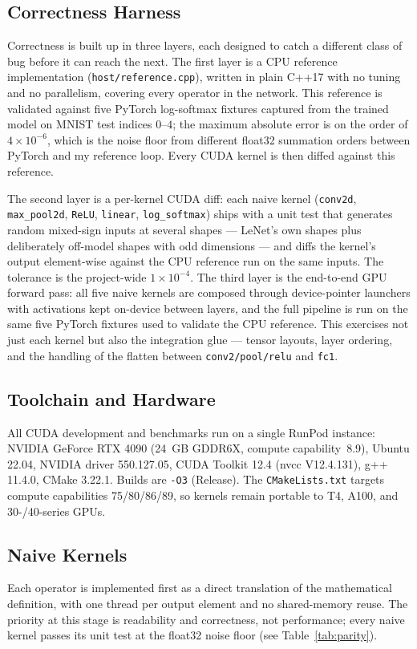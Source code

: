 \documentclass[conference]{IEEEtran}
\begin{document}
\subsection{Correctness Harness}
Correctness is built up in three layers, each designed to catch a
different class of bug before it can reach the next. The first layer
is a CPU reference implementation (\texttt{host/reference.cpp}),
written in plain C++17 with no tuning and no parallelism, covering
every operator in the network. This reference is validated against
five PyTorch log-softmax fixtures captured from the trained model on
MNIST test indices $0$--$4$; the maximum absolute error is on the
order of $4\times10^{-6}$, which is the noise floor from different
float32 summation orders between PyTorch and my reference loop.
Every CUDA kernel is then diffed against this reference.

The second layer is a per-kernel CUDA diff: each naive kernel
(\texttt{conv2d}, \texttt{max\_pool2d}, \texttt{ReLU},
\texttt{linear}, \texttt{log\_softmax}) ships with a unit test that
generates random mixed-sign inputs at several shapes --- LeNet's own
shapes plus deliberately off-model shapes with odd dimensions --- and
diffs the kernel's output element-wise against the CPU reference run
on the same inputs. The tolerance is the project-wide
$1\times10^{-4}$. The third layer is the end-to-end GPU forward pass:
all five naive kernels are composed through device-pointer launchers
with activations kept on-device between layers, and the full pipeline
is run on the same five PyTorch fixtures used to validate the CPU
reference. This exercises not just each kernel but also the
integration glue --- tensor layouts, layer ordering, and the handling
of the flatten between \texttt{conv2/pool/relu} and \texttt{fc1}.

\subsection{Toolchain and Hardware}
All CUDA development and benchmarks run on a single RunPod instance:
NVIDIA GeForce RTX 4090 (24~GB GDDR6X, compute capability~8.9), Ubuntu
22.04, NVIDIA driver 550.127.05, CUDA Toolkit 12.4 (nvcc V12.4.131),
g++ 11.4.0, CMake 3.22.1. Builds are \texttt{-O3} (Release). The
\texttt{CMakeLists.txt} targets compute capabilities 75/80/86/89, so
kernels remain portable to T4, A100, and 30-/40-series GPUs.

\subsection{Naive Kernels}
Each operator is implemented first as a direct translation of the
mathematical definition, with one thread per output element and no
shared-memory reuse. The priority at this stage is readability and
correctness, not performance; every naive kernel passes its unit test
at the float32 noise floor (see Table~\ref{tab:parity}).
\end{document}
